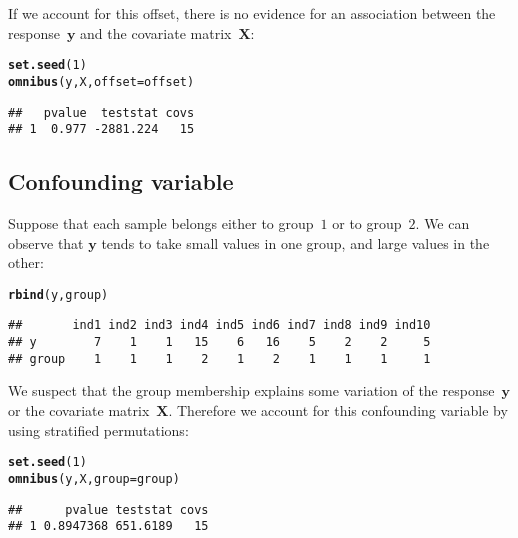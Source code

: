 \documentclass{article}\usepackage[]{graphicx}\usepackage[]{color}
\makeatletter
\newcommand{\hlnum}[1]{\textcolor[rgb]{0.686,0.059,0.569}{#1}}%
\newcommand{\hlstd}[1]{\textcolor[rgb]{0.345,0.345,0.345}{#1}}%
\newcommand{\hlkwc}[1]{\textcolor[rgb]{0.333,0.667,0.333}{#1}}%
\newcommand{\hlkwd}[1]{\textcolor[rgb]{0.737,0.353,0.396}{\textbf{#1}}}%
\newenvironment{kframe}{%
 \def\at@end@of@kframe{}%
 \ifinner\ifhmode%
  \def\at@end@of@kframe{\end{minipage}}%
  \begin{minipage}{\columnwidth}%
 \fi\fi%
 \def\FrameCommand##1{\hskip\@totalleftmargin \hskip-\fboxsep
 \colorbox{shadecolor}{##1}\hskip-\fboxsep
     \hskip-\linewidth \hskip-\@totalleftmargin \hskip\columnwidth}%
 \MakeFramed {\advance\hsize-\width
   \@totalleftmargin\z@ \linewidth\hsize
   \@setminipage}}%
 {\par\unskip\endMakeFramed%
 \at@end@of@kframe}
\newenvironment{knitrout}{}{} %
\makeatother
\begin{document}
If we account for this offset, there is no evidence for an association between the response~$\boldsymbol{y}$ and the covariate matrix~$\boldsymbol{X}$:
\begin{knitrout}
\color{fgcolor}\begin{kframe}
\begin{alltt}
\hlkwd{set.seed}\hlstd{(}\hlnum{1}\hlstd{)}
\hlkwd{omnibus}\hlstd{(y,X,}\hlkwc{offset}\hlstd{=offset)}
\end{alltt}
\begin{verbatim}
##   pvalue  teststat covs
## 1  0.977 -2881.224   15
\end{verbatim}
\end{kframe}
\end{knitrout}

\subsection{Confounding variable}
\label{omnibus_confounding_variable}

Suppose that each sample belongs either to group~$1$ or to group~$2$. We can observe that $\boldsymbol{y}$ tends to take small values in one group, and large values in the other:
\begin{knitrout}
\color{fgcolor}\begin{kframe}
\begin{alltt}
\hlkwd{rbind}\hlstd{(y,group)}
\end{alltt}
\begin{verbatim}
##       ind1 ind2 ind3 ind4 ind5 ind6 ind7 ind8 ind9 ind10
## y        7    1    1   15    6   16    5    2    2     5
## group    1    1    1    2    1    2    1    1    1     1
\end{verbatim}
\end{kframe}
\end{knitrout}

We suspect that the group membership explains some variation of the response~$\boldsymbol{y}$ or the covariate matrix~$\boldsymbol{X}$. Therefore we account for this confounding variable by using stratified permutations:
\begin{knitrout}
\color{fgcolor}\begin{kframe}
\begin{alltt}
\hlkwd{set.seed}\hlstd{(}\hlnum{1}\hlstd{)}
\hlkwd{omnibus}\hlstd{(y,X,}\hlkwc{group}\hlstd{=group)}
\end{alltt}
\begin{verbatim}
##      pvalue teststat covs
## 1 0.8947368 651.6189   15
\end{verbatim}
\end{kframe}
\end{knitrout}
\end{document}

